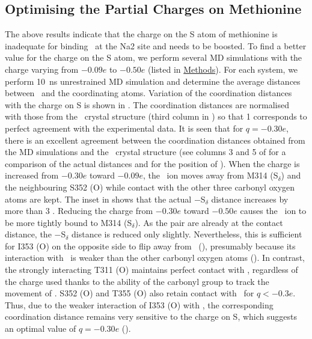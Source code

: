 \subsection{Optimising the Partial Charges on Methionine}
The above results indicate that the charge on the S atom of methionine is inadequate for binding 
\Na\ at the Na2 site and needs to be boosted. To find a better value for the charge on the S atom, 
we perform several MD simulations with the charge varying from $-0.09e$ to $-0.50e$ (listed in 
\hyperref[na2:theory]{Methods}). For each system, we perform 10~ns unrestrained MD simulation and 
determine the average distances between \Na\ and the coordinating atoms. Variation of the coordination 
distances with the charge on S is shown in . The coordination distances are normalised 
with those from the \GltTk\ crystal structure (third column in ) so that 1 corresponds 
to perfect agreement with the experimental data. It is seen that for $q = -0.30e$, there is an excellent 
agreement between the coordination distances obtained from the MD simulations and the \GltTk\ crystal 
structure (see columns 3 and 5 of  for a comparison of the actual distances and 
 for the position of \Na). When the charge is increased from $-0.30e$ toward $-0.09e$, 
the \Na\ ion moves away from M314 (S$_{\delta}$) and the neighbouring S352 (O) while contact with the 
other three carbonyl oxygen atoms are kept. The inset in  shows that the actual  
\Na$-$S$_{\delta}$ distance increases by more than 3 \angs. Reducing the charge from $-0.30e$ toward 
$-0.50e$ causes the \Na\ ion to be more tightly bound to M314 (S$_{\delta}$). As the pair are already at 
the contact distance, the \Na$-$S$_{\delta}$ distance is reduced only slightly. Nevertheless, this is 
sufficient for I353 (O) on the opposite side to flip away from \Na\ (), presumably 
because its interaction with \Na\ is weaker than the other carbonyl oxygen atoms (). In 
contrast, the strongly interacting T311 (O) maintains perfect contact with \Na, regardless of the 
charge used thanks to the ability of the carbonyl group to track the movement of \Na. S352 (O) and T355 
(O) also retain contact with \Na\ for $q < -0.3e$. Thus, due to the weaker interaction of I353 (O) with 
\Na, the corresponding coordination distance remains very sensitive to the charge on S, which suggests 
an optimal value of $q = -0.30e$ (). 


